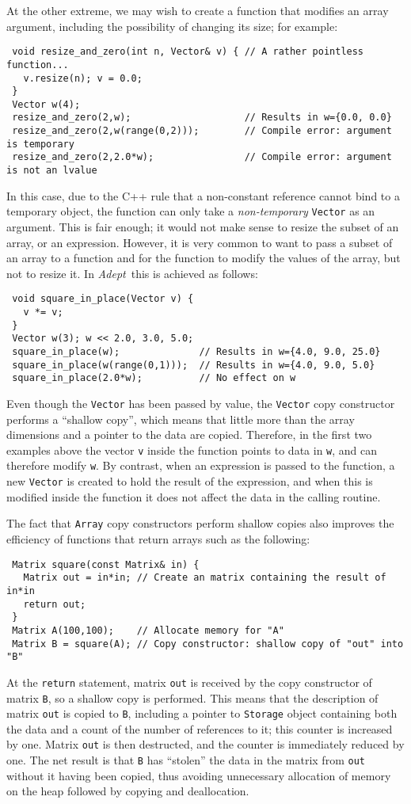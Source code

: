 \documentclass[a4,oneside]{book}
\def\codesize{\small}
\def\Adept{\emph{Adept}}
\def\code#1{{\codesize\texttt{#1}}}
\begin{document}
At the other extreme, we may wish to create a function that modifies
an array argument, including the possibility of changing its size; for
example:
\begin{lstlisting}
 void resize_and_zero(int n, Vector& v) { // A rather pointless function...
   v.resize(n); v = 0.0;
 }
 Vector w(4);
 resize_and_zero(2,w);                    // Results in w={0.0, 0.0}
 resize_and_zero(2,w(range(0,2)));        // Compile error: argument is temporary
 resize_and_zero(2,2.0*w);                // Compile error: argument is not an lvalue
\end{lstlisting}
In this case, due to the C++ rule that a non-constant reference cannot
bind to a temporary object, the function can only take a
\emph{non-temporary} \code{Vector} as an argument.  This is fair
enough; it would not make sense to resize the subset of an array, or
an expression. However, it is very common to want to pass a subset of
an array to a function and for the function to modify the values of
the array, but not to resize it. In \Adept\ this is achieved as
follows:
\begin{lstlisting}
 void square_in_place(Vector v) {
   v *= v;
 }
 Vector w(3); w << 2.0, 3.0, 5.0;
 square_in_place(w);              // Results in w={4.0, 9.0, 25.0}
 square_in_place(w(range(0,1)));  // Results in w={4.0, 9.0, 5.0}
 square_in_place(2.0*w);          // No effect on w
\end{lstlisting}
Even though the \code{Vector} has been passed by value, the
\code{Vector} copy constructor performs a ``shallow copy'', which
means that little more than the array dimensions and a pointer to the
data are copied. Therefore, in the first two examples above the vector
\code{v} inside the function points to data in \code{w}, and can
therefore modify \code{w}.  By contrast, when an expression is passed
to the function, a new \code{Vector} is created to hold the result of
the expression, and when this is modified inside the function it does
not affect the data in the calling routine.

The fact that \code{Array} copy constructors perform shallow copies
also improves the efficiency of functions that return arrays such as
the following:
\begin{lstlisting}
 Matrix square(const Matrix& in) {
   Matrix out = in*in; // Create an matrix containing the result of in*in
   return out;  
 }
 Matrix A(100,100);    // Allocate memory for "A"
 Matrix B = square(A); // Copy constructor: shallow copy of "out" into "B"
\end{lstlisting}
At the \code{return} statement, matrix \code{out} is received by the
copy constructor of matrix \code{B}, so a shallow copy is
performed. This means that the description of matrix \code{out} is
copied to \code{B}, including a pointer to \code{Storage} object
containing both the data and a count of the number of references to
it; this counter is increased by one. Matrix \code{out} is then
destructed, and the counter is immediately reduced by one. The net
result is that \code{B} has ``stolen'' the data in the matrix from
\code{out} without it having been copied, thus avoiding unnecessary
allocation of memory on the heap followed by copying and deallocation. 
\end{document}
